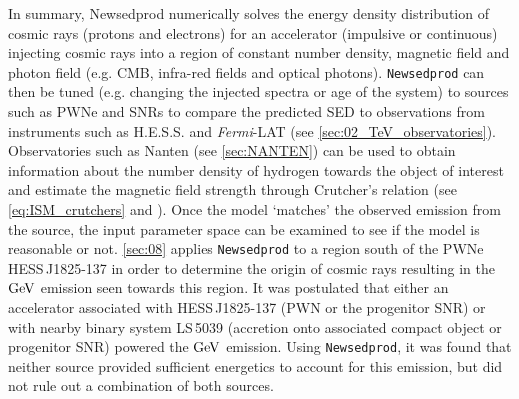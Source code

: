In summary, {\tt} Newsedprod numerically solves the energy density distribution of cosmic rays (protons and electrons) for an accelerator (impulsive or continuous) injecting cosmic rays into a region of constant number density, magnetic field and photon field (e.g. CMB, infra-red fields and optical photons). {\tt Newsedprod} can then be tuned (e.g. changing the injected spectra or age of the system) to sources such as PWNe and SNRs to compare the predicted SED to observations from instruments such as H.E.S.S. and \textit{Fermi}-LAT (see \autoref{sec:02_TeV_observatories}). Observatories such as Nanten (see \autoref{sec:NANTEN}) can be used to obtain information about the number density of hydrogen towards the object of interest and estimate the magnetic field strength through Crutcher's relation (see \autoref{eq:ISM_crutchers} and \cite{2010ApJ...725..466C}). Once the model `matches' the observed emission from the source, the input parameter space can be examined to see if the model is reasonable or not.
\newpar
\autoref{sec:08} applies {\tt Newsedprod} to a region south of the PWNe \mbox{HESS\,J1825-137} in order to determine the origin of cosmic rays resulting in the $\si{\giga\electronvolt}$ emission seen towards this region. It was postulated that either an accelerator associated with \mbox{HESS\,J1825-137} (PWN or the progenitor SNR) or with nearby binary system \mbox{LS\,5039} (accretion onto associated compact object or progenitor SNR) powered the $\si{\giga\electronvolt}$ emission. Using {\tt Newsedprod}, it was found that neither source provided sufficient energetics to account for this emission, but did not rule out a combination of both sources.